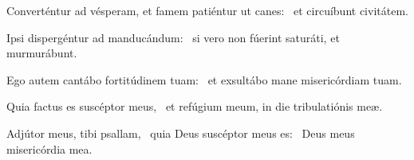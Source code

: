 \item Converténtur ad vésperam, et famem patiéntur ut canes:~\psstar{} et circuíbunt civitátem.

\item Ipsi dispergéntur ad mandu\-cándum:~\psstar{} si vero non fúerint saturáti, et murmurábunt.

\item Ego autem cantábo fortitúdinem tuam:~\psstar{} et exsultábo mane misericórdiam tuam.

\item Quia factus es suscéptor meus,~\psstar{} et refúgium meum, in die tribulatiónis meæ.

\item Adjútor meus, tibi psallam,~\pscross{} quia Deus suscéptor meus es:~\psstar{} Deus meus misericórdia mea.

